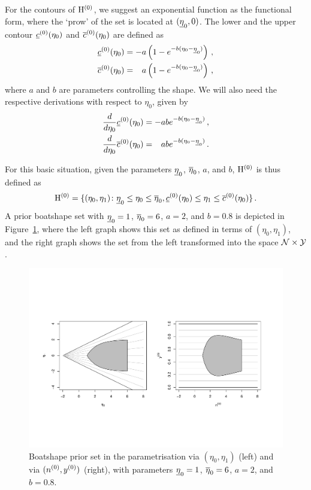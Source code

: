 For the contours of $\mathrm{H}^{(0)}$, we suggest an exponential function as the functional form,
where the `prow' of the set is located at $(\underline{\eta}_0, 0)$.
The lower and the upper contour $\underline{c}^{(0)}(\eta_0)$ and $\overline{c}^{(0)}(\eta_0)$ are defined as
\begin{align*}
\czl(\eta_0) &= -a \left( 1 - e^{-b(\eta_0 - \ezl)} \right)\,, \\
\czu(\eta_0) &= \phantom{-}%
                 a \left( 1 - e^{-b(\eta_0 - \ezl)} \right)\,, 
\end{align*}
where $a$ and $b$ are parameters controlling the shape.
We will also need the respective derivations with respect to $\eta_0$, given by
\begin{align*}
\frac{d}{d\eta_0} \czl(\eta_0) &= -ab e^{-b(\eta_0 - \ezl)}\,, \\
\frac{d}{d\eta_0} \czu(\eta_0) &= \phantom{-}%
                                   ab e^{-b(\eta_0 - \ezl)}\,.
\end{align*}

For this basic situation, given the parameters $\underline{\eta}_0$, $\overline{\eta}_0$, $a$, and $b$,
$\mathrm{H}^{(0)}$ is thus defined as
\begin{align}
\label{eq:basicset}
\mathrm{H}^{(0)} =
\{(\eta_0,\eta_1) \colon \underline{\eta}_0 \le \eta_0 \le \overline{\eta}_0, \underline{c}^{(0)}(\eta_0) \le  \eta_1 \le \overline{c}^{(0)}(\eta_0) \}\,.
\end{align}
A prior boatshape set with $\underline{\eta}_0=1$, $\overline{\eta}_0=6$, $a=2$, and $b=0.8$ is depicted in Figure~\ref{fig:boatshape-prior},
where the left graph shows this set as defined in terms of $(\eta_0,\eta_1)$,
and the right graph shows the set from the left transformed into the space $\mathcal{N} \times \mathcal{Y}$.

\begin{figure}  %
\centering
\includegraphics[trim = 15mm 45mm 25mm 60mm, clip, width=\textwidth]{R/boatshape-prior}%
\caption[Boatshape prior set in the parametrisation via $(\eta_0,\eta_1)$ and via $(\nz,\yz)$.]%
{Boatshape prior set in the parametrisation via $(\eta_0,\eta_1)$ (left) and via $(\nz,\yz)$ (right),
with parameters $\underline{\eta}_0=1$, $\overline{\eta}_0=6$, $a=2$, and $b=0.8$.}
\label{fig:boatshape-prior}
\end{figure}


